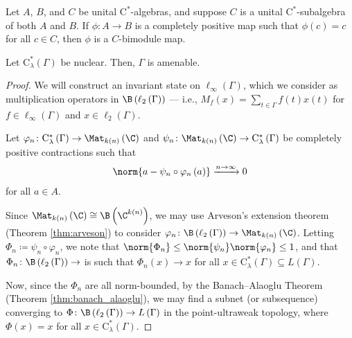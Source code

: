 \begin{corollary}\label{cor:multiplicative_domain}
  Let $A$, $B$, and $C$ be unital $\mathrm{C}^{\ast}$-algebras, and suppose $C$ is a unital $\mathrm{C}^{\ast}$-subalgebra of both $A$ and $B$. If $\phi\colon A\rightarrow B$ is a completely positive map such that $\phi(c) = c$ for all $c\in C$, then $\phi$ is a $C$-bimodule map.
\end{corollary}
\begin{theorem}\label{thm:nuclearity_implies_amenability}
  Let $\mathrm{C}^{\ast}_{\lambda}\left( \Gamma \right)$ be nuclear. Then, $\Gamma$ is amenable.
\end{theorem}
\begin{proof}
  We will construct an invariant state on $\ell_{\infty}\left( \Gamma \right)$, which we consider as multiplication operators in $\B\left( \ell_2\left( \Gamma \right) \right)$ --- i.e., $M_{f}(x) = \sum_{t\in\Gamma}f(t)x(t)$ for $f\in \ell_{\infty}\left( \Gamma \right)$ and $x\in \ell_2\left( \Gamma \right)$.\newline

  Let $\varphi_n\colon \mathrm{C}^{\ast}_{\lambda}\left( \Gamma \right)\rightarrow \Mat_{k(n)}\left( \C \right)$ and $\psi_n\colon \Mat_{k(n)}\left( \C \right)\rightarrow \mathrm{C}^{\ast}_{\lambda}\left( \Gamma \right)$ be completely positive contractions such that
  \begin{align*}
    \norm{a - \psi_n\circ\varphi_n\left( a \right)}\xrightarrow{n\rightarrow\infty} 0
  \end{align*}
  for all $a\in A$.\newline

  Since $\Mat_{k(n)}\left( \C \right) \cong \B\left( \C^{k(n)} \right)$, we may use Arveson's extension theorem (Theorem \ref{thm:arveson}) to consider $\varphi_n\colon \B\left( \ell_2\left( \Gamma \right) \right)\rightarrow \Mat_{k(n)}\left( \C \right)$. Letting $\Phi_{n}\coloneq \psi_n\circ\varphi_n$, we note that $\norm{\Phi_n}\leq \norm{\psi_n}\norm{\varphi_n}\leq 1$, and that $\Phi_n\colon \B\left( \ell_2\left( \Gamma \right) \right)\rightarrow $ is such that $\Phi_n\left( x \right)\rightarrow x$ for all $x\in \mathrm{C}^{\ast}_{\lambda}\left( \Gamma \right)\subseteq L\left( \Gamma \right)$.\newline

  Now, since the $\Phi_n$ are all norm-bounded, by the Banach--Alaoglu Theorem (Theorem \ref{thm:banach_alaoglu}), we may find a subnet (or subsequence) converging to $\Phi\colon \B\left( \ell_2\left( \Gamma \right) \right)\rightarrow L\left( \Gamma \right)$ in the point-ultraweak topology, where $\Phi(x) = x$ for all $x\in \mathrm{C}^{\ast}_{\lambda}\left( \Gamma \right)$.\newline


\end{proof}
